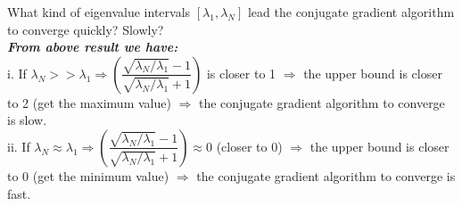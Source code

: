 \documentclass[14pt,a4paper]{article}
\begin{document}
\begin{enumerate}
	
	What kind of eigenvalue intervals $[\lambda_1,\lambda_N]$ lead the conjugate gradient algorithm to converge quickly? Slowly?\\
	\hspace*{1cm} \textbf{\textit{From above result we have:}}\\
	i. If $\lambda_N >> \lambda_1 \Rightarrow\left( \dfrac{\sqrt{\lambda_N/\lambda_1}-1}{\sqrt{\lambda_N/\lambda_1}+1}\right) $ is closer to 1 $\Rightarrow$ the upper bound is closer to 2 (get the maximum value) $\Rightarrow$ the conjugate gradient algorithm to converge is slow.\\
	ii. If $\lambda_N \approx \lambda_1 \Rightarrow\left( \dfrac{\sqrt{\lambda_N/\lambda_1}-1}{\sqrt{\lambda_N/\lambda_1}+1}\right) \approx 0 $ (closer to 0) $\Rightarrow$ the upper bound is closer to 0 (get the minimum value) $\Rightarrow$ the conjugate gradient algorithm to converge is fast.\\
	 
\end{enumerate}
	
	 
\end{document}
